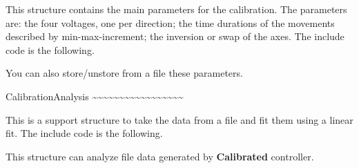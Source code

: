 This structure contains the main parameters for the calibration. The
parameters are: the four voltages, one per direction; the time durations
of the movements described by min-max-increment; the inversion or swap
of the axes. The include code is the following.

\begin{Shaded}
\begin{Highlighting}[]
\end{Highlighting}
\end{Shaded}

You can also store/unstore from a file these parameters.

\begin{Shaded}
\begin{Highlighting}[]
\NormalTok{;}
\end{Highlighting}
\end{Shaded}

CalibrationAnalysis
\textasciitilde\textasciitilde\textasciitilde\textasciitilde\textasciitilde\textasciitilde\textasciitilde\textasciitilde\textasciitilde\textasciitilde\textasciitilde\textasciitilde\textasciitilde\textasciitilde\textasciitilde\textasciitilde\textasciitilde{}

This is a support structure to take the data from a file and fit them
using a linear fit. The include code is the following.

\begin{Shaded}
\begin{Highlighting}[]
\end{Highlighting}
\end{Shaded}

This structure can analyze file data generated by \textbf{Calibrated}
controller.

\begin{Shaded}
\begin{Highlighting}[]
\NormalTok{;}
\end{Highlighting}
\end{Shaded}

